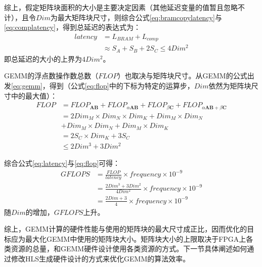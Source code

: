综上，假定矩阵块面积的大小是主要决定因素（其他延迟变量的值暂且忽略不计），且令\(\mathit{Dim}\)为最大矩阵块尺寸，则综合公式\ref{eq:bramcopylatency}与\ref{eq:complatency}，得到总延迟的表达式为：
\begin{equation}\label{eq:latency}
\begin{aligned}
\mathit{latency} 
& = \mathit{L_{BRAM}} + \mathit{L_{comp}} \\
& \approx \mathit{S_A + S_B + 2S_C} \leq 4Dim^2
\end{aligned}
\end{equation}
即总延迟的大小的上界为\(\mathit{4Dim^2}\)。

GEMM的浮点数操作数总数（\(\mathit{FLOP}\)）也取决与矩阵块尺寸。从GEMM的公式出发\ref{eq:gemm}，得到（公式\ref{eq:flop}中的下标为特定的运算步，\(\mathit{Dim}\)依然为矩阵块尺寸中的最大值）：
\begin{equation}\label{eq:flop}
\begin{aligned}
\mathit{FLOP} 
& = \mathit{FLOP_{\mathbf{AB}}} 
  + \mathit{FLOP_{\alpha\mathbf{AB}}}
  + \mathit{FLOP_{\beta\mathbf{C}}}
  + \mathit{FLOP_{\alpha\mathbf{AB}+\beta\mathbf{C}}} \\
& = \mathit{2 Dim_M\times Dim_N\times Dim_K + Dim_M \times Dim_N} \\
& + \mathit{Dim_M \times Dim_N + Dim_M \times Dim_K} \\
& = \mathit{2 S_C \times Dim_K + 3 S_C} \\
& \leq \mathit{2 Dim^3 + 3 Dim^2}
\end{aligned}
\end{equation}

综合公式\ref{eq:latency}与\ref{eq:flop}可得：
\begin{equation}\label{eq:gflops}
\begin{aligned}
\mathit{GFLOPS}
& = \mathit{\frac{FLOP}{latency} \times frequency \times 10^{-9}} \\
& = \mathit{\frac{2 Dim^3 + 3 Dim ^ 2}{4 Dim^2}\times frequency \times 10^{-9}} \\
& = \mathit{\frac{2 Dim + 3}{4} \times frequency \times 10^{-9}}
\end{aligned}
\end{equation}
随$\mathit{Dim}$的增加，$\mathit{GFLOPS}$上升。

综上，GEMM计算的硬件性能与使用的矩阵块的最大尺寸成正比，因而优化的目标应为最大化GEMM中使用的矩阵块大小。矩阵块大小的上限取决于FPGA上各类资源的总量，和GEMM硬件设计使用各类资源的方式。下一节具体阐述如何通过修改HLS生成硬件设计的方式来优化GEMM的算法效率。

